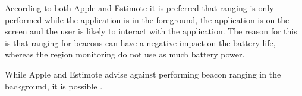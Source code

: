 According to both Apple and Estimote it is preferred that ranging is only performed while the application is in the foreground, 
\ie the application is on the screen and the user is likely to interact with the application. 
The reason for this is that ranging for beacons can have a negative impact on the battery life, 
whereas the region monitoring do not use as much battery power.

While Apple and Estimote advise against performing beacon ranging in the background, it is possible \cite{apple:monitoring-ibeacon} \cite{estimote:monitoring-ranging}.

